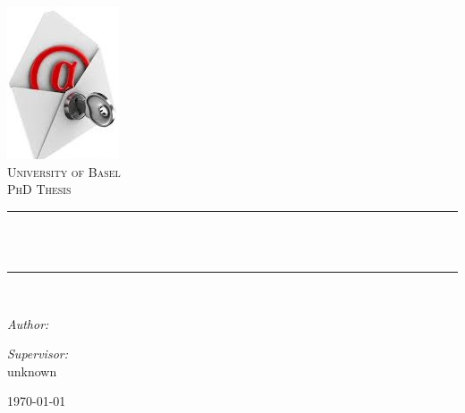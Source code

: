 \begin{titlepage}
\pagecolor{orange}\afterpage{\nopagecolor}
\begin{center}
\includegraphics[height=0.4\textwidth]{./inc/logo}~\\[1cm]

\textsc{\Large University of Basel}\\[1.5cm]

\textsc{\Large PhD Thesis}\\[0.5cm]

\newcommand{\HRule}{\rule{\linewidth}{0.5mm}}
\HRule \\[0.4cm]
{ \huge \bfseries \makeatletter\@title\makeatother \\[0.4cm] }

\HRule \\[1.5cm]

\begin{minipage}{0.6\textwidth}
\begin{flushleft} \large
\emph{Author:}\\
 \makeatletter\@author\makeatother
\end{flushleft}
\end{minipage}
\begin{minipage}{0.6\textwidth}
\begin{flushright} \large
\emph{Supervisor:} \\
 unknown
\end{flushright}
\end{minipage}

\vfill

{\large \today}

\end{center}
\end{titlepage}

